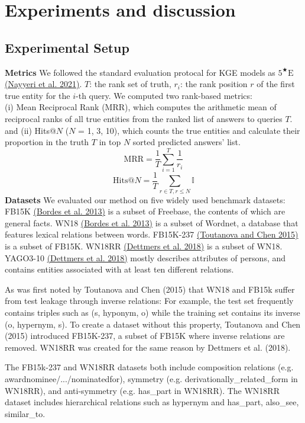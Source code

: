 \documentclass[9pt]{ctexart}
\theoremstyle{definition}
\begin{document}
\section{Experiments and discussion}
\subsection{Experimental Setup}
\textbf{Metrics} We followed the standard evaluation protocal for KGE models as $5^{\bigstar}\mathrm{E}$
\hyperlink{Nay21}{(Nayyeri et al. 2021)}.
$T$: the rank set of truth, $r_i$: the rank position $r$ of the first true entity for the $i$-th query.
We computed two rank-based metrics:\\ 
(i) Mean Reciprocal Rank (MRR), which computes the arithmetic mean of reciprocal ranks of all true entities from the ranked list of answers to queries $T$.
and (ii) Hits@$N$ ($N$ = 1, 3, 10), which counts the true entities and calculate their proportion in the truth $T$ in top $N$ sorted predicted answers' list.
\[\mathrm{MRR}=\frac{1}{T}\sum_{i=1}^{T}\frac{1}{r_i}\]
\[\mathrm{Hits@}N=\frac{1}{T}\sum_{r\in T, r\leq N} \mathbb{I}\]
\textbf{Datasets} We evaluated our method on five widely used benchmark datasets: 
FB15K
\hyperlink{Bor13}{(Bordes et al. 2013)} is a subset of Freebase, the contents of which are general facts.
WN18 
\hyperlink{Bor13}{(Bordes et al. 2013)} is a subset of Wordnet, a database that features lexical relations between words.
FB15K-237 
\hyperlink{Tou15}{(Toutanova and Chen 2015)} is a subset of FB15K.
WN18RR 
\hyperlink{Det18}{(Dettmers et al. 2018)} is a subset of WN18.
YAGO3-10
\hyperlink{Det18}{(Dettmers et al. 2018)} mostly describes attributes of persons, and contains entities associated with at least ten different relations.

As was first noted by Toutanova and Chen (2015) that WN18 and FB15k suffer from test leakage through inverse relations:
For example, the test set frequently contains triples such as (s, hyponym, o) while the training set contains its inverse (o, hypernym, s).
To create a dataset without this property, Toutanova and Chen (2015) introduced FB15K-237, a subset of FB15K where inverse relations are removed. 
WN18RR was created for the same reason by Dettmers et al. (2018).

The FB15k-237 and WN18RR datasets both include composition relations (e.g. awardnominee/.../nominatedfor), 
symmetry (e.g. derivationally\_related\_form in WN18RR), and anti-symmetry (e.g. has\_part in WN18RR). 
The WN18RR dataset includes hierarchical relations such as hypernym and has\_part, also\_see, similar\_to.
\end{document}
